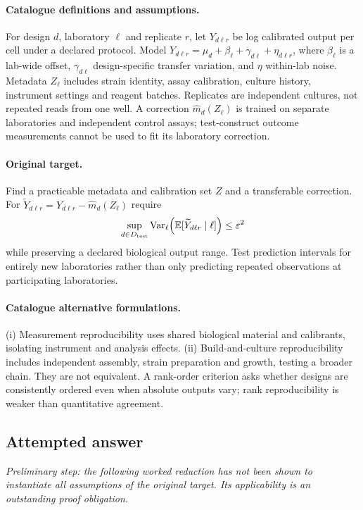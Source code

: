 \documentclass[11pt]{article}
\begin{document}
\paragraph{Catalogue definitions and assumptions.}
For design $d$, laboratory $\ell$ and replicate $r$, let $Y_{d\ell r}$ be log calibrated output per cell under a declared protocol. Model $Y_{d\ell r}=\mu_d+\beta_\ell+\gamma_{d\ell}+\eta_{d\ell r}$, where $\beta_\ell$ is a lab-wide offset, $\gamma_{d\ell}$ design-specific transfer variation, and $\eta$ within-lab noise. Metadata $Z_\ell$ includes strain identity, assay calibration, culture history, instrument settings and reagent batches. Replicates are independent cultures, not repeated reads from one well. A correction $\widehat m_d(Z_\ell)$ is trained on separate laboratories and independent control assays; test-construct outcome measurements cannot be used to fit its laboratory correction.
\paragraph{Original target.}
Find a practicable metadata and calibration set $Z$ and a transferable correction. For $\widetilde Y_{d\ell r}=Y_{d\ell r}-\widehat m_d(Z_\ell)$ require
\[
\sup_{d\in D_{\rm test}}\operatorname{Var}_\ell\!\left(
\mathbb{E}[\widetilde Y_{d\ell r}\mid\ell]\right)\leq\varepsilon^2
\]
while preserving a declared biological output range. Test prediction intervals for entirely new laboratories rather than only predicting repeated observations at participating laboratories.
\paragraph{Catalogue alternative formulations.}
(i) Measurement reproducibility uses shared biological material and calibrants, isolating instrument and analysis effects. (ii) Build-and-culture reproducibility includes independent assembly, strain preparation and growth, testing a broader chain. They are not equivalent. A rank-order criterion asks whether designs are consistently ordered even when absolute outputs vary; rank reproducibility is weaker than quantitative agreement.
\subsection{Attempted answer}
\noindent\emph{Preliminary step: the following worked reduction has not been shown to instantiate all assumptions of the original target. Its applicability is an outstanding proof obligation.}
\end{document}
